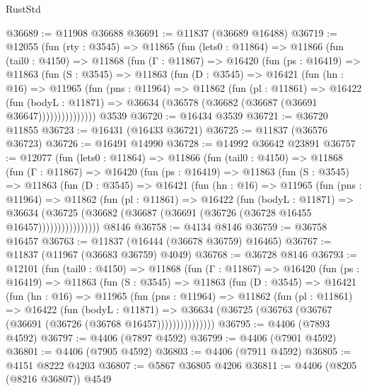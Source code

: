 \begin{lexlean}{RustStd}
\begin{coremodule}
@36689 := @11908 @36688
@36691 := @11837 (@36689 @16488)
@36719 := @12055
    (fun (rty : @3545) =>
    @11865
      (fun (lets0 : @11864) =>
      @11866
        (fun (tail0 : @4150) =>
        @11868
          (fun (Γ : @11867) =>
          @16420
            (fun (ps : @16419) =>
            @11863
              (fun (S : @3545) =>
              @11863
                (fun (D : @3545) =>
                @16421
                  (fun (hn : @16) =>
                  @11965
                    (fun (pns : @11964) =>
                    @11862
                      (fun (pl : @11861) =>
                      @16422
                        (fun (bodyL : @11871) =>
                        @36634 (@36578 (@36682 (@36687 (@36691 @36647)))))))))))))))
    @3539
@36720 := @16434 @3539
@36721 := @36720 @11855
@36723 := @16431 (@16433 @36721)
@36725 := @11837 (@36576 @36723)
@36726 := @16491 @14990
@36728 := @14992 @36642 @23891
@36757 := @12077
    (fun (lets0 : @11864) =>
    @11866
      (fun (tail0 : @4150) =>
      @11868
        (fun (Γ : @11867) =>
        @16420
          (fun (ps : @16419) =>
          @11863
            (fun (S : @3545) =>
            @11863
              (fun (D : @3545) =>
              @16421
                (fun (hn : @16) =>
                @11965
                  (fun (pns : @11964) =>
                  @11862
                    (fun (pl : @11861) =>
                    @16422
                      (fun (bodyL : @11871) =>
                      @36634
                        (@36725
                          (@36682 (@36687 (@36691 (@36726 (@36728 @16455 @16457))))))))))))))))
    @8146
@36758 := @4134 @8146
@36759 := @36758 @16457
@36763 := @11837 (@16444 (@36678 @36759) @16465)
@36767 := @11837 (@11967 (@36683 @36759) @4049)
@36768 := @36728 @8146
@36793 := @12101
    (fun (tail0 : @4150) =>
    @11868
      (fun (Γ : @11867) =>
      @16420
        (fun (ps : @16419) =>
        @11863
          (fun (S : @3545) =>
          @11863
            (fun (D : @3545) =>
            @16421
              (fun (hn : @16) =>
              @11965
                (fun (pns : @11964) =>
                @11862
                  (fun (pl : @11861) =>
                  @16422
                    (fun (bodyL : @11871) =>
                    @36634 (@36725 (@36763 (@36767 (@36691 (@36726 (@36768 @16457)))))))))))))))
@36795 := @4406 (@7893 @4592)
@36797 := @4406 (@7897 @4592)
@36799 := @4406 (@7901 @4592)
@36801 := @4406 (@7905 @4592)
@36803 := @4406 (@7911 @4592)
@36805 := @4151 @8222 @4203
@36807 := @5867 @36805 @4206
@36811 := @4406 (@8205 (@8216 @36807)) @4549

\end{coremodule}
\end{lexlean}
